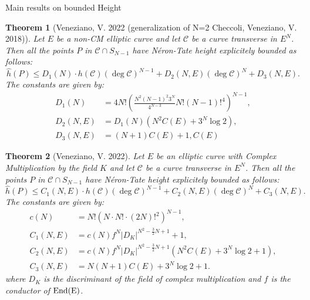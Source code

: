 \documentclass[handout]{beamer}
\newcommand{\Ci}{\mathcal{C}}
\newtheorem{thm}{Theorem}
\begin{document}
\begin{frame}{Main results on bounded Height}
\begin{thm} [Veneziano, V. 2022 (generalization of N=2 Checcoli, Veneziano, V. 2018)]
  Let $E$ be a non-CM elliptic curve   and let $\Ci$ be a curve transverse  in $E^N$. Then all the points $P$  in  $\Ci\cap S_{N-1}$ have N\'eron-Tate height explicitely bounded as follows:
   \begin{equation*}
      \hat h(P)\leq D_1(N)\cdot h(\Ci)(\deg\Ci)^{N-1} +D_2(N,E)(\deg\Ci)^N+D_3(N,E).
\end{equation*}
The constants are given by:
\begin{align*}
    D_1(N)&=4N!\left(\frac{N^2 (N-1)^2 3^N}{4^{N-3}}N! (N-1)!^4\right)^{N-1},\\
  D_2(N,E)&=D_1(N)\left(N^2C(E)+3^{N}\log 2\right),\\
  D_3(N,E)&=(N+1)C(E)+1,   
  C(E)
 \end{align*}  
  \end{thm}
  
\end{frame}






\begin{frame}
\begin{thm} [Veneziano, V. 2022]
  Let $E$ be an elliptic curve with Complex Multiplication by the field $K$ and let $\Ci$ be a curve transverse  in $E^N$. Then all the points $P$ in $\Ci\cap S_{N-1}$ have N\'eron-Tate height explicitely bounded as follows:
   \begin{equation*}
      \hat h(P)\leq C_1(N,E)\cdot h(\Ci)(\deg\Ci)^{N-1} +C_2(N,E)(\deg\Ci)^N +C_3(N,E).
\end{equation*}
The constants are given by:
\begin{align*}
 c(N)&=N!\left(N\cdot N!\cdot (2N)!^2\right)^{N-1},\\
  C_1(N,E)&=c(N)f^N|D_K|^{N^2-\frac{3}{2}N+1}+1,\\
   C_2(N,E)&=c(N)f^N|D_K|^{N^2-\frac{3}{2}N+1}\left(N^2C(E)+3^{N}\log 2+1\right),\\
  C_3(N,E)&=N(N+1)C(E)+3^{N}\log 2+1.
 \end{align*}  
 where $D_K$ is the discriminant of the field of complex multiplication and $f$ is the conductor of $\rm{End}(E)$. 
  \end{thm}
  
\end{frame}
\end{document}
